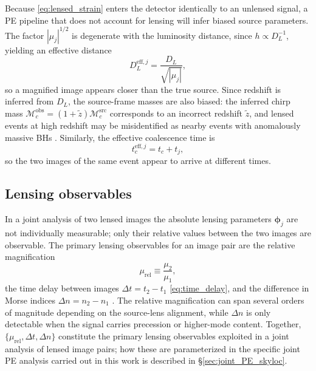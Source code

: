 Because \eqref{eq:lensed_strain} enters the detector 
identically to an unlensed signal, a PE pipeline that does 
not account for lensing will infer biased source parameters. 
The factor $|\mu_j|^{1/2}$ is degenerate with the luminosity
distance, since $h \propto D_L^{-1}$, yielding an effective 
distance
\begin{equation}
    D_L^{\mathrm{eff},j} = \frac{D_L}{\sqrt{|\mu_j|}},
    \label{eq:apparent_DL}
\end{equation}
so a magnified image appears closer than the true source. 
Since redshift is inferred from $D_L$, the source-frame 
masses are also biased: the inferred chirp mass 
$\mathcal{M}_c^{\mathrm{obs}} = 
(1+\tilde{z})\mathcal{M}_c^{\mathrm{src}}$ corresponds to 
an incorrect redshift $\tilde{z}$, and lensed events at 
high redshift may be misidentified as nearby events with 
anomalously massive BHs \cite{degenerate_lens_properties}. Similarly, the effective coalescence time is
\begin{equation}
    t_c^{\mathrm{eff},j} = t_c + t_j,
    \label{eq:apparent_tc}
\end{equation}
so the two images of the same event appear to arrive at 
different times.

\subsection{Lensing observables}


In a joint analysis of two lensed images the absolute 
lensing parameters $\boldsymbol{\phi}_j$ are not 
individually measurable; only their relative values 
between the two images are observable. The primary 
lensing observables for an image pair are the 
relative magnification
\begin{equation}
    \mu_{\mathrm{rel}} \equiv \frac{\mu_2}{\mu_1},
    \label{eq:magnification_ratio}
\end{equation}
the time delay between images $\Delta t = t_2 - t_1$ 
\eqref{eq:time_delay}, and the difference in Morse 
indices $\Delta n = n_2 - n_1$ \cite{PE_lensing_bayes}. The relative magnification can span several orders of magnitude depending on the source-lens alignment, while $\Delta n$ is only detectable when the signal carries precession or higher-mode content. Together, $\{\mu_{\mathrm{rel}}, \Delta t, \Delta n\}$ constitute the primary lensing observables exploited in a joint analysis of lensed image pairs; how these are parameterized in the specific joint PE analysis carried out in this work is described in \S\ref{sec:joint_PE_skyloc}.



